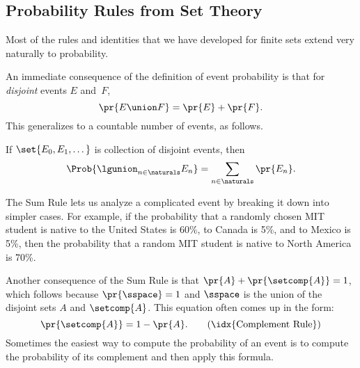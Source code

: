 \subsection{Probability Rules from Set Theory}\label{sec:union_bound}

Most of the rules and identities that we have developed for finite
sets extend very naturally to probability.  

\iffalse We'll cover several examples in this section, but first let's
review some definitions that should already be familiar.\fi

An immediate consequence of the definition of event probability is
that for \emph{disjoint} events $E$ and~$F$,
\[
    \pr{E \union F} = \pr{E} + \pr{F}.
\]
This generalizes to a countable number of events, as follows.

\begin{rul}
  If $\set{E_0,E_1,\dots}$ is collection of disjoint
  events, then
\[
    \Prob{\lgunion_{n\in\naturals}E_n} = \sum_{n\in\naturals} \pr{E_n}.
\]
\end{rul}

The Sum Rule lets us analyze a complicated event by breaking it down
into simpler cases.  For example, if the probability that a randomly
chosen MIT student is native to the United States is 60\%, to Canada
is 5\%, and to Mexico is 5\%, then the probability that a random MIT
student is native to North America is 70\%.

Another consequence of the Sum Rule is that $\pr{A} + \pr{\setcomp{A}} =
1$, which follows because $\pr{\sspace}=1$ and $\sspace$ is the union
of the disjoint sets $A$ and $\setcomp{A}$.  This equation often comes up
in the form:
\begin{equation}%
\pr{\setcomp{A}}  =  1 - \pr{A}. \tag{\idx{Complement Rule}}
\end{equation}
Sometimes the easiest way to compute the probability of an event is to compute
the probability of its complement and then apply this formula.

